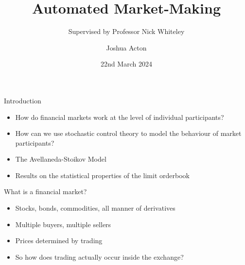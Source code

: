\documentclass{beamer} %
\title{Automated Market-Making}
\author{Joshua Acton}
\date{22nd March 2024}
\subtitle{Supervised by Professor Nick Whiteley}
\begin{document}
\begin{frame}
    \titlepage
\end{frame}

\begin{frame}{Introduction}
    \begin{itemize}
    \item How do financial markets work at the level of individual participants?
    \item How can we use stochastic control theory to model the behaviour of market participants?
    \item The Avellaneda-Stoikov Model
    \item Results on the statistical properties of the limit orderbook
    \end{itemize}
\end{frame}

\begin{frame}{What is a financial market?}
    \begin{itemize}
        \item Stocks, bonds, commodities, all manner of derivatives
        \item Multiple buyers, multiple sellers
        \item Prices determined by trading
        \item So how does trading actually occur inside the exchange?
    \end{itemize}
\end{frame}
\end{document}
